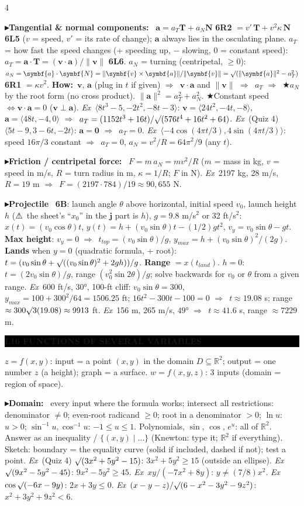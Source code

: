 \documentclass{article}
\newcommand\vb[1]{\symbf{#1}}                 %
\newcommand\nm[1]{\lVert #1\rVert}            %
\newcommand\ip[1]{\langle #1\rangle}          %
\newcommand\sh[1]{{\setlength\fboxsep{0.18pt}\colorbox{black!22}{\textbf{#1}}}} %
\newcommand\hd[1]{\par\vspace{0.5pt}\needspace{4\baselineskip}\noindent
  {\setlength\fboxsep{0.45pt}\colorbox{black}{\parbox{\dimexpr\linewidth-2\fboxsep}{\color{white}\bfseries #1}}}\par\nobreak\vspace{0.2pt}\nobreak}
\newcommand\pt[1]{\par\textbf{{\symf ▸}#1}\ }  %
\newcommand\ex{\textit{Ex}\ }                  %
\newcommand\how{\textbf{How:}\ }
\newcommand\warn{{\symf ⚠}}                    %
\newcommand\shc{{\symf ★}}                      %
\newcommand\rt{\smash{\surd}}               %
\newcommand\then{\ensuremath{\Rightarrow}}
\begin{document}
\begin{multicols*}{4}
\pt{Tangential \& normal components:} $\vb a=a_T\vb T+a_N\vb N$ \sh{6R2} $=v'\,\vb T+v^2\kappa\,\vb N$ \sh{6L5} ($v$ = speed, $v'$ = its rate of change); $\vb a$ always lies in the osculating plane. $a_T$ = how fast the speed changes (+ speeding up, $-$ slowing, 0 = constant speed): $a_T=\vb a\cdot\vb T=(\vb v\cdot\vb a)/\nm{\vb v}$ \sh{6L6}. $a_N$ = turning (centripetal, $\ge0$): $a_N=\vb a\cdot\vb N=\nm{\vb v\times\vb a}/\nm{\vb v}=\rt(\nm{\vb a}^2-a_T^2)$ \sh{6R1} $=\kappa v^2$. \how $\vb v$, $\vb a$ (plug in $t$ if given) \then\ $\vb v\cdot\vb a$ and $\nm{\vb v}$ \then\ $a_T$ \then\ \shc $a_N$ by the root form (no cross product). $\nm{\vb a}^2=a_T^2+a_N^2$. \shc Constant speed $\iff\vb v\cdot\vb a=0$ ($\vb v\perp\vb a$). \ex $\ip{8t^3-5,-2t^2,-8t-3}$: $\vb v=\ip{24t^2,-4t,-8}$, $\vb a=\ip{48t,-4,0}$ \then\ $a_T=(1152t^3+16t)/\rt(576t^4+16t^2+64)$. \ex (Quiz 4) $\ip{5t-9,3-6t,-2t}$: $\vb a=\vb0$ \then\ $a_T=0$. \ex $\ip{-4\cos(4\pi t/3),4\sin(4\pi t/3)}$: speed $16\pi/3$ constant \then\ $a_T=0$, $a_N=v^2/R=64\pi^2/9$ (any $t$).

\pt{Friction / centripetal force:} $F=m\,a_N=mv^2/R$ ($m$ = mass in kg, $v$ = speed in m/s, $R$ = turn radius in m, $\kappa=1/R$; $F$ in N). \ex 2197 kg, 28 m/s, $R=19$ m \then\ $F=(2197\cdot784)/19\approx90{,}655$ N.

\pt{Projectile} \sh{6B}: launch angle $\theta$ above horizontal, initial speed $v_0$, launch height $h$ (\warn\ the sheet's ``$x_0$'' in the $\vb j$ part is $h$), $g=9.8$ m/s$^2$ or 32 ft/s$^2$: $x(t)=(v_0\cos\theta)t$, $y(t)=h+(v_0\sin\theta)t-(1/2)gt^2$, $v_y=v_0\sin\theta-gt$. \textbf{Max height}: $v_y=0$ \then\ $t_{top}=(v_0\sin\theta)/g$, $y_{max}=h+(v_0\sin\theta)^2/(2g)$. \textbf{Lands} when $y=0$ (quadratic formula, + root): $t=(v_0\sin\theta+\rt((v_0\sin\theta)^2+2gh))/g$. \textbf{Range} $=x(t_{land})$. $h=0$: $t=(2v_0\sin\theta)/g$, range $(v_0^2\sin2\theta)/g$; solve backwards for $v_0$ or $\theta$ from a given range. \ex 600 ft/s, $30°$, 100-ft cliff: $v_0\sin\theta=300$, $y_{max}=100+300^2/64=1506.25$ ft; $16t^2-300t-100=0$ \then\ $t\approx19.08$ s; range $\approx300\rt3(19.08)\approx9913$ ft. \ex 156 m, 265 m/s, $49°$ \then\ $t\approx41.6$ s, range $\approx7229$ m.

\hd{L16 FUNCTIONS OF SEVERAL VARIABLES}
$z=f(x,y)$: input = a point $(x,y)$ in the domain $D\subseteq\mathbb R^2$; output = one number $z$ (a height); graph = a surface. $w=f(x,y,z)$: 3 inputs (domain = region of space).

\pt{Domain:} every input where the formula works; intersect all restrictions: denominator $\ne0$; even-root radicand $\ge0$; root in a denominator $>0$; $\ln u$: $u>0$; $\sin^{-1}u,\cos^{-1}u$: $-1\le u\le1$. Polynomials, $\sin$, $\cos$, $e^u$: all of $\mathbb R^2$. Answer as an inequality / $\{(x,y)\mid\dots\}$ (Knewton: type it; $\mathbb R^2$ if everything). Sketch: boundary = the equality curve (solid if included, dashed if not); test a point. \ex (Quiz 4) $\rt(3x^2+5y^2-15)$: $3x^2+5y^2\ge15$ (outside an ellipse). \ex $\rt(9x^2-5y^2-45)$: $9x^2-5y^2\ge45$. \ex $xy/(-7x^2+8y)$: $y\ne(7/8)x^2$. \ex $\cos\rt(-6x-9y)$: $2x+3y\le0$. \ex $(x-y-z)/\rt(6-x^2-3y^2-9z^2)$: $x^2+3y^2+9z^2<6$.


\end{multicols*}
\end{document}
